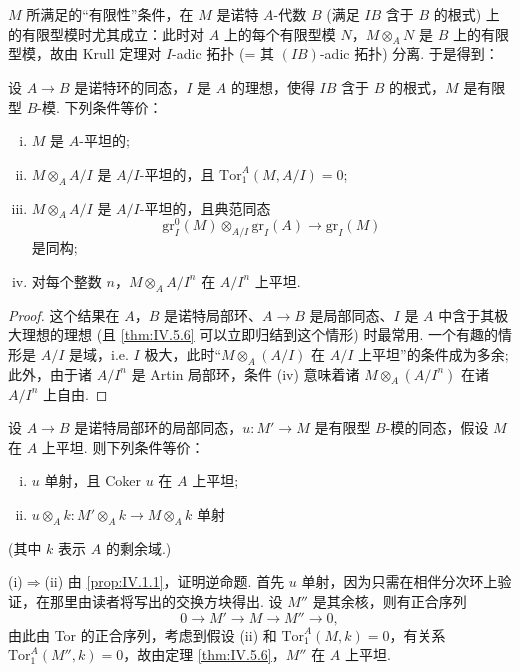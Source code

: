 $M$ 所满足的``有限性''条件，在 $M$ 是诺特 $A$-代数 $B$ (满足 $IB$ 含于 $B$ 的根式) 上的有限型模时尤其成立：此时对 $A$ 上的每个有限型模 $N$，$M \otimes_A N$ 是 $B$ 上的有限型模，故由 Krull 定理对 $I$-adic 拓扑 (= 其 $(IB)$-adic 拓扑) 分离. 于是得到：

\begin{theorem}\label{thm:IV.5.6}
设 $A \to B$ 是诺特环的同态，$I$ 是 $A$ 的理想，使得 $IB$ 含于 $B$ 的根式，$M$ 是有限型 $B$-模. 下列条件等价：
\begin{enumerate}[(i)]
\item $M$ 是 $A$-平坦的; 
\item $M \otimes_A A/I$ 是 $A/I$-平坦的，且 $\mathrm{Tor}_{1}^{A}(M, A/I) = 0$; 
\item $M \otimes_A A/I$ 是 $A/I$-平坦的，且典范同态
\[
\mathrm{gr}_{I}^{0}(M) \otimes_{A/I} \mathrm{gr}_{I}(A) \longrightarrow \mathrm{gr}_{I}(M)
\]
是同构; 
\item 对每个整数 $n$，$M \otimes_A A/I^n$ 在 $A/I^n$ 上平坦.
\end{enumerate}
\end{theorem}

\begin{proof}
这个结果在 $A$，$B$ 是诺特局部环、$A \to B$ 是局部同态、$I$ 是 $A$ 中含于其极大理想的理想 (且 \ref{thm:IV.5.6} 可以立即归结到这个情形) 时最常用. 一个有趣的情形是 $A/I$ 是域，i.e. $I$ 极大，此时``$M \otimes_A (A/I)$ 在 $A/I$ 上平坦''的条件成为多余; 此外，由于诸 $A/I^n$ 是 Artin 局部环，条件 (iv) 意味着诸 $M \otimes_A (A/I^n)$ 在诸 $A/I^n$ 上自由.
\end{proof}

\begin{corollary}\label{cor:IV.5.7}
设 $A \to B$ 是诺特局部环的局部同态，$u \colon M' \to M$ 是有限型 $B$-模的同态，假设 $M$ 在 $A$ 上平坦. 则下列条件等价：
\begin{enumerate}[(i)]
\item $u$ 单射，且 Coker $u$ 在 $A$ 上平坦; 
\item $u \otimes_A k \colon M' \otimes_A k \to M \otimes_A k$ 单射
\end{enumerate}
\end{corollary}

(其中 $k$ 表示 $A$ 的剩余域.)

(i)$\Rightarrow$(ii) 由 \ref{prop:IV.1.1}，证明逆命题. 首先 $u$ 单射，因为只需在相伴分次环上验证，在那里由读者将写出的交换方块得出. 设 $M''$ 是其余核，则有正合序列
\[
0 \longrightarrow M' \longrightarrow M \longrightarrow M'' \longrightarrow 0,
\]
由此由 Tor 的正合序列，考虑到假设 (ii) 和 $\mathrm{Tor}_{1}^{A}(M, k) = 0$，有关系 $\mathrm{Tor}_{1}^{A}(M'', k) = 0$，故由定理 \ref{thm:IV.5.6}，$M''$ 在 $A$ 上平坦.

